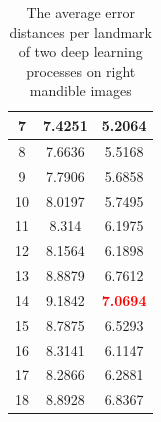 \documentclass[review]{elsarticle}
\begin{document}
\begin{table}[htbp]
\begin{minipage}[t]{0.45\textwidth}
\begin{tabular}{|c|c|c|}
	7 & 7.4251 & 5.2064 \\ \hline
	8 & 7.6636 & 5.5168 \\ \hline
	9 & 7.7906 & 5.6858 \\ \hline
	10 & 8.0197 & 5.7495 \\ \hline
	11 & 8.314 & 6.1975 \\ \hline
	12 & 8.1564 & 6.1898 \\ \hline
	13 & 8.8879 & 6.7612 \\ \hline
	14 & 9.1842 & \textcolor{red}{\textbf{7.0694}} \\ \hline
	15 & 8.7875 & 6.5293 \\ \hline
	16 & 8.3141 & 6.1147 \\ \hline
	17 & 8.2866 & 6.2881 \\ \hline
	18 & 8.8928 & 6.8367 \\ \hline
\end{tabular}
\caption{The average error distances per landmark of two deep learning processes on right mandible images}
\label{tblcmpmd}
\end{minipage}
\end{table}
\end{document}
